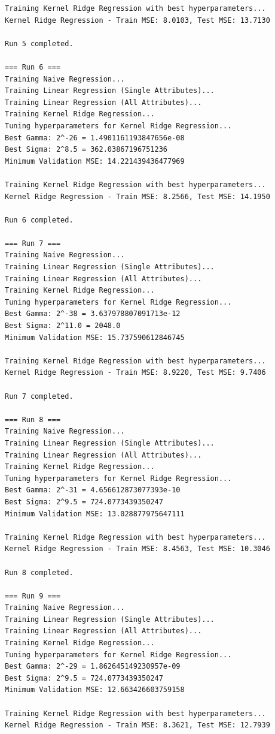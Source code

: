 \documentclass[final,3p,times,12pt]{article}
\begin{document}
\begin{verbatim}
Training Kernel Ridge Regression with best hyperparameters...
Kernel Ridge Regression - Train MSE: 8.0103, Test MSE: 13.7130

Run 5 completed.

=== Run 6 ===
Training Naive Regression...
Training Linear Regression (Single Attributes)...
Training Linear Regression (All Attributes)...
Training Kernel Ridge Regression...
Tuning hyperparameters for Kernel Ridge Regression...
Best Gamma: 2^-26 = 1.4901161193847656e-08
Best Sigma: 2^8.5 = 362.03867196751236
Minimum Validation MSE: 14.221439436477969

Training Kernel Ridge Regression with best hyperparameters...
Kernel Ridge Regression - Train MSE: 8.2566, Test MSE: 14.1950

Run 6 completed.

=== Run 7 ===
Training Naive Regression...
Training Linear Regression (Single Attributes)...
Training Linear Regression (All Attributes)...
Training Kernel Ridge Regression...
Tuning hyperparameters for Kernel Ridge Regression...
Best Gamma: 2^-38 = 3.637978807091713e-12
Best Sigma: 2^11.0 = 2048.0
Minimum Validation MSE: 15.737590612846745

Training Kernel Ridge Regression with best hyperparameters...
Kernel Ridge Regression - Train MSE: 8.9220, Test MSE: 9.7406

Run 7 completed.

=== Run 8 ===
Training Naive Regression...
Training Linear Regression (Single Attributes)...
Training Linear Regression (All Attributes)...
Training Kernel Ridge Regression...
Tuning hyperparameters for Kernel Ridge Regression...
Best Gamma: 2^-31 = 4.656612873077393e-10
Best Sigma: 2^9.5 = 724.0773439350247
Minimum Validation MSE: 13.028877975647111

Training Kernel Ridge Regression with best hyperparameters...
Kernel Ridge Regression - Train MSE: 8.4563, Test MSE: 10.3046

Run 8 completed.

=== Run 9 ===
Training Naive Regression...
Training Linear Regression (Single Attributes)...
Training Linear Regression (All Attributes)...
Training Kernel Ridge Regression...
Tuning hyperparameters for Kernel Ridge Regression...
Best Gamma: 2^-29 = 1.862645149230957e-09
Best Sigma: 2^9.5 = 724.0773439350247
Minimum Validation MSE: 12.663426603759158

Training Kernel Ridge Regression with best hyperparameters...
Kernel Ridge Regression - Train MSE: 8.3621, Test MSE: 12.7939


\end{verbatim}
\end{document}

